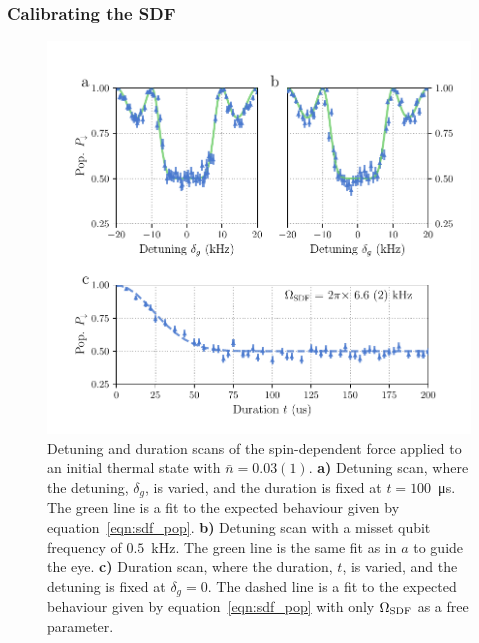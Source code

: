 \subsubsection{Calibrating the SDF}

    \begin{figure}
        \begin{center}
        \noindent\includegraphics[width=\linewidth]{
            figures/pdf_figure/sdf.pdf
            }
        \end{center}
        \caption{
            Detuning and duration scans of the spin-dependent force applied to an initial thermal state with $\bar{n} = 0.03(1)$. 
            \textbf{a)} Detuning scan, where the detuning, $\delta_g$, is varied, and the duration is fixed at $t=100$~\unit{\us}. The green line is a fit to the expected behaviour given by equation~\ref{eqn:sdf_pop}. 
            \textbf{b)} Detuning scan with a misset qubit frequency of $0.5$~\unit{\kHz}. The green line is the same fit as in $a$ to guide the eye. 
            \textbf{c)} Duration scan, where the duration, $t$, is varied, and the detuning is fixed at $\delta_g = 0$. The dashed line is a fit to the expected behaviour given by equation~\ref{eqn:sdf_pop} with only $\Omega_{\rm SDF}$ as a free parameter.
            }
        \label{fig:SDF}
    \end{figure}

